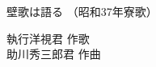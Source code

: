 \documentclass[10pt,b5j]{tarticle} %
\begin{document}
\begin{minipage}[c]{0.7\hsize} %
    \begin{center}
        {\LARGE
            壁歌は語る %
        }
        {\small 
            （昭和37年寮歌） %
        }
    \end{center}
\end{minipage}
\begin{minipage}[c]{0.3\hsize} %
    \begin{flushright} %
        執行洋視君 作歌\\助川秀三郎君 作曲 %
    \end{flushright}
\end{minipage}
\end{document}
